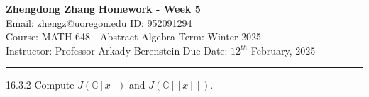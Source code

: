 \documentclass[a4paper, 12pt]{article}
\begin{document}
\noindent
\large\textbf{Zhengdong Zhang} \hfill \textbf{Homework - Week 5}   \\
Email: zhengz@uoregon.edu \hfill ID: 952091294 \\
\normalsize Course: MATH 648 - Abstract Algebra  \hfill Term: Winter 2025\\
Instructor: Professor Arkady Berenstein \hfill Due Date: $12^{th}$ February, 2025 \\
\noindent\rule{7in}{2.8pt}
\begin{problem}{16.3.2}
Compute \(J(\mathbb{C}[x])\) and \(J(\mathbb{C}[[x]])\).
\end{problem}
\end{document}

